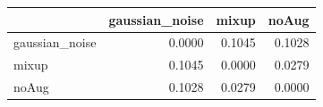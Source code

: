 \begin{tabular}{lrrr}
\toprule
 & gaussian_noise & mixup & noAug \\
\midrule
gaussian_noise & 0.0000 & 0.1045 & 0.1028 \\
mixup & 0.1045 & 0.0000 & 0.0279 \\
noAug & 0.1028 & 0.0279 & 0.0000 \\
\bottomrule
\end{tabular}
